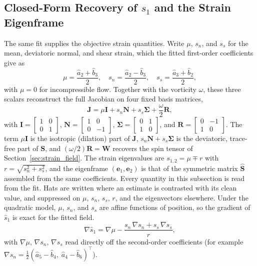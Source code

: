 \documentclass[lettersize,journal]{IEEEtran}
\begin{document}
\subsection{Closed-Form Recovery of $s_1$ and the Strain Eigenframe}

The same fit supplies the objective strain quantities. Write $\mu$,
$s_n$, and $s_s$ for the
mean, deviatoric normal, and shear strain, which the fitted first-order
coefficients give as
\begin{equation}
    \mu = \frac{\hat{a}_2 + \hat{b}_3}{2}, \quad
    s_n = \frac{\hat{a}_2 - \hat{b}_3}{2}, \quad
    s_s = \frac{\hat{a}_3 + \hat{b}_2}{2},
\end{equation}
with $\mu = 0$ for incompressible flow.
Together with the vorticity $\omega$, these three scalars reconstruct
the full Jacobian on four fixed basis matrices,
\begin{equation}
    \mathbf{J} = \mu\mathbf{I} + s_n\mathbf{N} + s_s\boldsymbol{\Sigma}
        + \frac{\omega}{2}\mathbf{R},
    \label{eq:four_matrix}
\end{equation}
with
$\mathbf{I} = \left[\begin{smallmatrix}1&0\\0&1\end{smallmatrix}\right]$,
$\mathbf{N} = \left[\begin{smallmatrix}1&0\\0&-1\end{smallmatrix}\right]$,
$\boldsymbol{\Sigma} = \left[\begin{smallmatrix}0&1\\1&0\end{smallmatrix}\right]$,
and $\mathbf{R} = \left[\begin{smallmatrix}0&-1\\1&0\end{smallmatrix}\right]$.
The term $\mu\mathbf{I}$ is the isotropic (dilation) part of $\mathbf{J}$,
$s_n\mathbf{N} + s_s\boldsymbol{\Sigma}$ is the deviatoric, trace-free
part of $\mathbf{S}$, and $(\omega/2)\mathbf{R} = \mathbf{W}$ recovers
the spin tensor of Section~\ref{sec:strain_field}. The strain eigenvalues are
$s_{1,2} = \mu \mp r$ with $r = \sqrt{s_n^2 + s_s^2}$, and the
eigenframe $(\mathbf{e}_1, \mathbf{e}_2)$ is that of the symmetric
matrix $\hat{\mathbf{S}}$ assembled from the same coefficients. Every
quantity in this subsection is read from the fit. Hats are written where
an estimate is contrasted with its clean value, and suppressed on $\mu$, $s_n$, $s_s$,
$r$, and the eigenvectors elsewhere. Under
the quadratic model, $\mu$, $s_n$, and $s_s$ are affine functions of
position, so the gradient of $\hat{s}_1$ is exact for the fitted field.
\begin{equation}
    \nabla \hat{s}_1 = \nabla\mu
    - \frac{s_n\,\nabla s_n + s_s\,\nabla s_s}{r},
    \label{eq:grad_s1}
\end{equation}
with $\nabla\mu$, $\nabla s_n$, $\nabla s_s$ read directly off the
second-order coefficients (for example $\nabla s_n = \tfrac{1}{2}
(\hat{a}_5 - \hat{b}_4,\; \hat{a}_4 - \hat{b}_6)^\top$).
\end{document}
